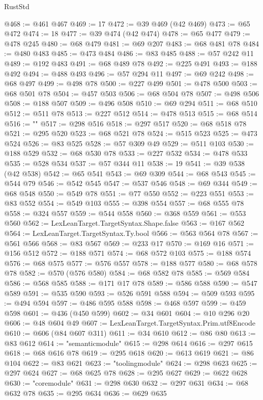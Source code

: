 \begin{lexlean}{RustStd}
\begin{coremodule}
{\begin{coremodule}
{{{{{{{{{{{{{{{{{{{{{{{{{{{{{{{{{{@468 := @461 @467
@469 := 17
@472 := @39 @469 (@42 @469)
@473 := @65 @472
@474 := 18
@477 := @39 @474 (@42 @474)
@478 := @65 @477
@479 := @478 @245
@480 := @68 @479
@481 := @69 @207
@483 := @68 @481 @78
@484 := @480 @483
@485 := @473 @484
@486 := @83 @485
@488 := @57 @242 @11
@489 := @192 @483
@491 := @68 @489 @78
@492 := @225 @491
@493 := @188 @492
@494 := @488 @493
@496 := @57 @294 @11
@497 := @69 @242
@498 := @68 @497
@499 := @498 @78
@500 := @227 @499
@501 := @478 @500
@503 := @68 @501 @78
@504 := @457 @503
@506 := @68 @504 @78
@507 := @498 @506
@508 := @188 @507
@509 := @496 @508
@510 := @69 @294
@511 := @68 @510
@512 := @511 @78
@513 := @227 @512
@514 := @478 @513
@515 := @68 @514
@516 := "{"
@517 := @298 @516
@518 := @297 @517
@520 := @68 @518 @78
@521 := @295 @520
@523 := @68 @521 @78
@524 := @515 @523
@525 := @473 @524
@526 := @83 @525
@528 := @57 @309 @49
@529 := @511 @103
@530 := @188 @529
@532 := @68 @530 @78
@533 := @227 @532
@534 := @478 @533
@535 := @528 @534
@537 := @57 @344 @11
@538 := 19
@541 := @39 @538 (@42 @538)
@542 := @65 @541
@543 := @69 @309
@544 := @68 @543
@545 := @544 @79
@546 := @542 @545
@547 := @537 @546
@548 := @69 @344
@549 := @68 @548
@550 := @549 @78
@551 := @77 @550
@552 := @223 @551
@553 := @83 @552
@554 := @549 @103
@555 := @398 @554
@557 := @68 @555 @78
@558 := @324 @557
@559 := @544 @558
@560 := @368 @559
@561 := @553 @560
@562 := LexLeanTarget.TargetSyntax.Shape.false
@563 := @167 @562
@564 := LexLeanTarget.TargetSyntax.Ty.bool
@566 := @563 @564 @78
@567 := @561 @566
@568 := @83 @567
@569 := @233 @17
@570 := @169 @16
@571 := @156 @512
@572 := @188 @571
@574 := @68 @572 @103
@575 := @188 @574
@576 := @68 @575
@577 := @576 @557
@578 := @188 @577
@580 := @68 @578 @78
@582 := @570 (@576 @580)
@584 := @68 @582 @78
@585 := @569 @584
@586 := @568 @585
@588 := @171 @17 @78
@589 := @586 @588
@590 := @547 @589
@591 := @535 @590
@593 := @526 @591 @588
@594 := @509 @593
@595 := @494 @594
@597 := @486 @595 @588
@598 := @468 @597
@599 := @459 @598
@601 := @436 (@450 @599)
@602 := @34 @601
@604 := @10 @296 @20
@606 := @48 @604 @49
@607 := LexLeanTarget.TargetSyntax.Prim.utf8Encode
@610 := @606 (@84 @607 @311)
@611 := @34 @610
@612 := @86 @80
@613 := @83 @612
@614 := "semanticmodule"
@615 := @298 @614
@616 := @297 @615
@618 := @68 @616 @78
@619 := @295 @618
@620 := @613 @619
@621 := @86 @104
@622 := @83 @621
@623 := "toolingmodule"
@624 := @298 @623
@625 := @297 @624
@627 := @68 @625 @78
@628 := @295 @627
@629 := @622 @628
@630 := "coremodule"
@631 := @298 @630
@632 := @297 @631
@634 := @68 @632 @78
@635 := @295 @634
@636 := @629 @635
}}}}}}}}}}}}}}}}}}}}}}}}}}}}}}}}}}}
\end{coremodule}}
\end{coremodule}
\end{lexlean}
